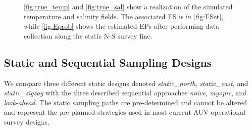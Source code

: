 \documentclass[aoas]{imsart}
\begin{document}
\begin{figure}[!h]
  \hfill
  \caption{\ref{fig:true_temp} and \ref{fig:true_sal} show a
    realization of the simulated temperature and salinity fields. The
    associated ES is in \ref{fig:ESet}, while \ref{fig:Eprob} shows
    the estimated EPs after performing data collection along the
    static N-S survey line.}
\label{fig:realisations}
\end{figure}

\subsection{Static and Sequential Sampling Designs}
\label{sec:sampling_designs}


We compare three different static designs denoted
\textit{static\_north}, \textit{static\_east}, and
\textit{static\_zigzag} with the three described sequential approaches
\textit{naive}, \textit{myopic}, and \textit{look-ahead}. The static
sampling paths are pre-determined and cannot be altered and represent
the pre-planned strategies used in most current AUV operational survey
designs.
\end{document}
